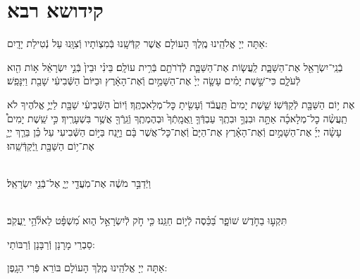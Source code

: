 \documentclass[twoside, openany, parskip=half, 11pt]{book}
\begin{document}
\birkashabonim

\vfill

\quad{}\quad{}

\chapter[קידושא רבא]{ קידושא רבא }



אַתָּה יְיָ אֱלֹהֵֽינוּ מֶֽלֶךְ הָעוֹלָם אֲשֶׁר קִדְּֿשָֽׁנוּ בְּֿמִצְוֹתָיו וְֿצִוָּֽנוּ עַל נְֿטִילַת יָדָֽיִם:


בְֿנֵֽי־יִשְׂרָאֵ֖ל אֶת־הַשַּׁבָּ֑ת לַֽעֲשׂ֧וֹת אֶת־הַשַּׁבָּ֛ת לְֿדֹֽרֹתָ֖ם בְּֿרִ֥ית עוֹלָֽם׃ בֵּינִ֗י וּבֵין֙ בְּֿנֵ֣י יִשְׂרָאֵ֔ל א֥וֹת הִ֖וא לְֿעֹלָ֑ם כִּי־שֵׁ֣שֶׁת יָמִ֗ים עָשָׂ֤ה יְיָ֙ אֶת־הַשָּׁמַ֣יִם וְֿאֶת־הָאָ֔רֶץ וּבַיּוֹם֙ הַשְּֿׁבִיעִ֔י שָׁבַ֖ת וַיִּנָּפַֽשׁ׃


אֶת י֥וֹם הַשַּׁבָּ֖ת לְֿקַדְּֿשֽׁוֹ׃ שֵׁ֤שֶׁת יָמִים֙ תַּֽעֲבֹ֔ד וְֿעָשִׂ֖יתָ כׇּל־מְלַאכְתֶּֽךָ׃ וְֿיוֹם֙ הַשְּֿׁבִיעִ֔י שַׁבָּ֖ת לַיֽיֳ֣ אֱלֹהֶיךָ לֹא תַֽעֲשֶׂ֨ה כׇל־מְלָאכָ֜ה אַתָּ֣ה וּבִנְךָ֣ וּבִתֶֽךָ עַבְדְּֿךָ֤ וַֽאֲמָֽתְֿךָ֙ וּבְהֶמְתֶֽךָ וְֿגֵֽרְֿךָ֖ אֲשֶׁ֥ר בִּשְׁעָרֶֽיךָ׃ כִּ֣י שֵֽׁשֶׁת יָמִים֩ עָשָׂ֨ה יְיָ֜ אֶת־הַשָּׁמַ֣יִם וְֿאֶת־הָאָ֗רֶץ אֶת־הַיָּם֙ וְֿאֶת־כׇּל־אֲשֶׁר בָּ֔ם וַיָּ֖נַח בַּיּ֣וֹם הַשְּֿׁבִיעִי עַל כֵּ֗ן בֵּרַ֧ךְ יְיָ֛ אֶת־י֥וֹם הַשַּׁבָּ֖ת וַֽיְֿקַדְּֿשֵֽׁהוּ׃

\begin{sometimes}

\\
וַיְֿדַבֵּ֣ר מֹשֶׁ֔ה אֶת־מֹֽעֲדֵ֖י יְיָ֑ אֶל־בְּֿנֵ֖י יִשְׂרָאֵֽל׃

\sepline

\\
תִּקְע֣וּ בַחֹ֣דֶשׁ שׁוֹפָ֑ר בַּ֝כֵּ֗סֶה לְֿי֣וֹם חַגֵּֽנוּ׃ כִּ֤י חֹ֣ק לְֿיִשְׂרָאֵ֣ל ה֑וּא מִ֝שְׁפָּ֗ט לֵאלֹ֘הֵ֥י יַֽעֲקֹֽב׃

\end{sometimes}

\vspace{-.5\baselineskip}

\begin{scriptsize}
סַבְרֵי מָרָנָן וְֿרַבָּנָן וְֿרַבּוֹתַי: \\
\end{scriptsize}
אַתָּה יְיָ אֱלֹהֵֽינוּ מֶֽלֶךְ הָעוֹלָם בּוֹרֵא פְּֿרִי הַגָֽפֶן:
\end{document}
